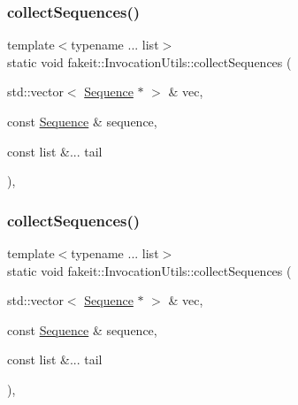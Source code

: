 \mbox{\label{structfakeit_1_1InvocationUtils_a43b674a2f1109acf4c870e8fb9c2571d}} 
\subsubsection{\texorpdfstring{collectSequences()}{collectSequences()}\hspace{0.1cm}{\footnotesize\ttfamily [7/18]}}
{\footnotesize\ttfamily template$<$typename ... list$>$ \\
static void fakeit\+::\+Invocation\+Utils\+::collect\+Sequences (\begin{DoxyParamCaption}\item[{std\+::vector$<$ \mbox{\hyperlink{classfakeit_1_1Sequence}{Sequence}} $\ast$ $>$ \&}]{vec,  }\item[{const \mbox{\hyperlink{classfakeit_1_1Sequence}{Sequence}} \&}]{sequence,  }\item[{const list \&...}]{tail }\end{DoxyParamCaption})\hspace{0.3cm}{\ttfamily [inline]}, {\ttfamily [static]}}

\mbox{\label{structfakeit_1_1InvocationUtils_a43b674a2f1109acf4c870e8fb9c2571d}} 
\subsubsection{\texorpdfstring{collectSequences()}{collectSequences()}\hspace{0.1cm}{\footnotesize\ttfamily [8/18]}}
{\footnotesize\ttfamily template$<$typename ... list$>$ \\
static void fakeit\+::\+Invocation\+Utils\+::collect\+Sequences (\begin{DoxyParamCaption}\item[{std\+::vector$<$ \mbox{\hyperlink{classfakeit_1_1Sequence}{Sequence}} $\ast$ $>$ \&}]{vec,  }\item[{const \mbox{\hyperlink{classfakeit_1_1Sequence}{Sequence}} \&}]{sequence,  }\item[{const list \&...}]{tail }\end{DoxyParamCaption})\hspace{0.3cm}{\ttfamily [inline]}, {\ttfamily [static]}}

